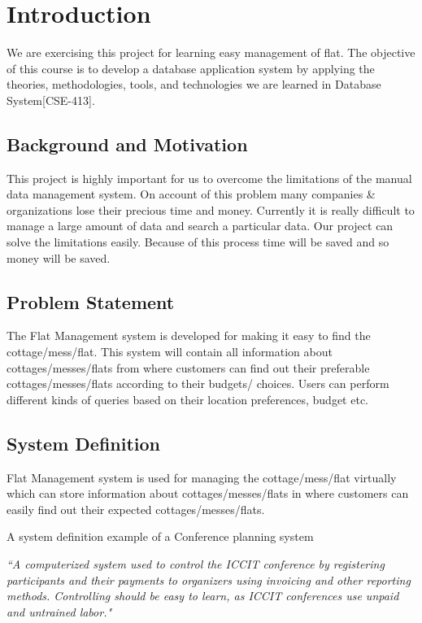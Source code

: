 
\section{Introduction}\label{sec:introduction}
We are exercising this project for learning easy management of flat. The objective of this course is to develop a database application system by applying the theories, methodologies, tools, and technologies we are learned in Database System[CSE-413].

\subsection{Background and Motivation}\label{subsec:bm}
This project is highly important for us to overcome the limitations of the manual data
management system. On account of this problem many companies & organizations lose  their precious time and money. Currently it is really difficult to manage a large amount
of data and search a particular data. Our project can solve the limitations
easily. Because of this process time will be saved and so money will be saved.

\subsection{Problem Statement}\label{subsec:ps}
The Flat Management system is developed for making it easy to find the cottage/mess/flat. This system will contain all information about cottages/messes/flats from where customers can find out their preferable cottages/messes/flats according to their budgets/ choices. Users can perform different kinds
of queries based on their location preferences, budget etc.
\subsection{System Definition}\label{subsec:sd} 
Flat Management system  is used for managing the cottage/mess/flat virtually which can store information about cottages/messes/flats in where customers can easily find out their expected cottages/messes/flats.

A system definition example of a Conference planning system

\textit{``A computerized system used to control the ICCIT conference by registering participants and their payments to organizers using invoicing and other reporting methods. Controlling should be easy to learn, as ICCIT conferences use unpaid and untrained labor."}
\newpage
\noindent
